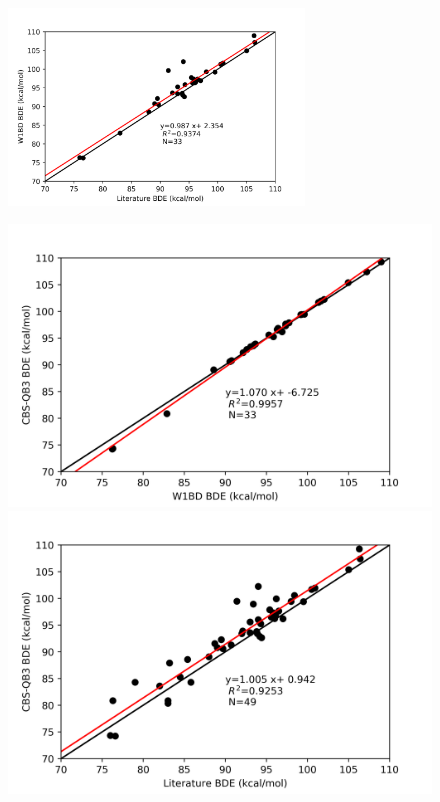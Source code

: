 \begin{figure}
  \centering
  \includegraphics[width=0.7\textwidth]{figures/lit-w1bd}
\end{figure}

\begin{figure}
\centering
\begin{minipage}{8cm}
  \centering
  \includegraphics[width=\textwidth]{figures/w1bd-cbsqb3}
\end{minipage}%
\begin{minipage}{8cm}
  \centering
  \includegraphics[width=\textwidth]{figures/lit-cbsqb3}
\end{minipage}
\end{figure}


